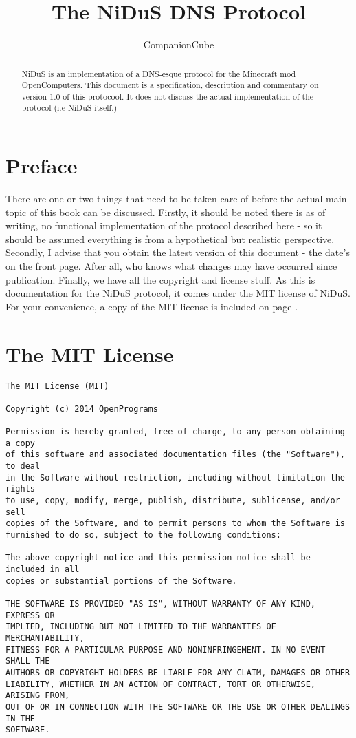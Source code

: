 \documentclass[]{report}
\title{The NiDuS DNS Protocol}
\author{CompanionCube}
\begin{document}
\maketitle

\begin{abstract}
NiDuS is an implementation of a DNS-esque protocol for the Minecraft mod OpenComputers. This document is a specification, description and commentary on version 1.0 of this protocool. It does not discuss the actual implementation of the protocol (i.e NiDuS itself.)
\end{abstract}

\chapter*{Preface}
There are one or two things that need to be taken care of before the actual main topic of this book can be discussed. Firstly, it should be noted there is as of writing, no functional implementation of the protocol described here - so it should be assumed everything is from a hypothetical but realistic perspective. Secondly, I advise that you obtain the latest version of this document - the date's on the front page. After all, who knows what changes may have occurred since publication. Finally, we have all the copyright and license stuff. As this is documentation for the NiDuS protocol, it comes under the MIT license of NiDuS. For your convenience, a copy of the MIT license is included on page \pageref{mit}.

\appendix
\chapter{The MIT License}\label{mit}
\begin{verbatim}
The MIT License (MIT)

Copyright (c) 2014 OpenPrograms

Permission is hereby granted, free of charge, to any person obtaining a copy
of this software and associated documentation files (the "Software"), to deal
in the Software without restriction, including without limitation the rights
to use, copy, modify, merge, publish, distribute, sublicense, and/or sell
copies of the Software, and to permit persons to whom the Software is
furnished to do so, subject to the following conditions:

The above copyright notice and this permission notice shall be included in all
copies or substantial portions of the Software.

THE SOFTWARE IS PROVIDED "AS IS", WITHOUT WARRANTY OF ANY KIND, EXPRESS OR
IMPLIED, INCLUDING BUT NOT LIMITED TO THE WARRANTIES OF MERCHANTABILITY,
FITNESS FOR A PARTICULAR PURPOSE AND NONINFRINGEMENT. IN NO EVENT SHALL THE
AUTHORS OR COPYRIGHT HOLDERS BE LIABLE FOR ANY CLAIM, DAMAGES OR OTHER
LIABILITY, WHETHER IN AN ACTION OF CONTRACT, TORT OR OTHERWISE, ARISING FROM,
OUT OF OR IN CONNECTION WITH THE SOFTWARE OR THE USE OR OTHER DEALINGS IN THE
SOFTWARE.
\end{verbatim}
\end{document}
